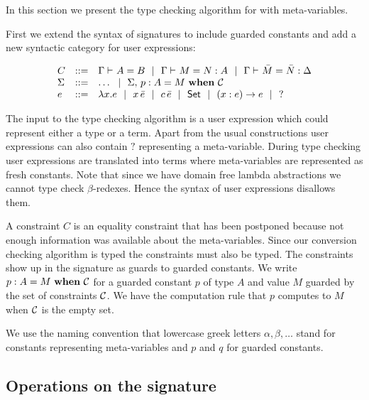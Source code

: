 
In this section we present the type checking algorithm for {\Core} with meta-variables.

First we extend
the syntax of signatures to include guarded constants and add a new syntactic
category for user expressions:

{\small
\[\begin{array}{lcll}
    C & ::= & {\Gamma} \vdash_{}A=B ~~|~~ {\Gamma} \vdash_{}M=N:A ~~|~~
	      {\Gamma} \vdash_{}\bar M=\bar N:\Delta \\
    \Sigma & ::= & \ldots ~~|~~
		{\Sigma},\,{} {p} : {A} = {M} ~\mathbf{when}~ {\mathcal{C}} \\
    e & ::= & \lambda x.{}e ~~|~~ x\,\bar e ~~|~~ c\,\bar e ~~|~~ \mathsf{Set} ~~|~~ (x:e)\to{}e ~~|~~ ? \\
\end{array}\]
}

The input to the type checking algorithm is a user expression which could
represent either a type or a term. Apart from the usual constructions user
expressions can also contain $?$ representing a meta-variable. During type
checking user expressions are translated into {\Core} terms where
meta-variables are represented as fresh constants. Note that since we have
domain free lambda abstractions we cannot type check $\beta$-redexes. Hence the
syntax of user expressions disallows them.

A constraint $C$ is an equality constraint that has been postponed
because not enough information was available about the meta-variables. Since
our conversion checking algorithm is typed the constraints must also be typed. The
constraints show up in the signature as guards to guarded constants. We write
${p} : {A} = {M} ~\mathbf{when}~ {\mathcal{C}}$ for a guarded constant $p$ of type $A$ and value $M$
guarded by the set of constraints $\mathcal{C}$. We have the computation rule that $p$
computes to $M$ when $\mathcal{C}$ is the empty set.

We use the naming convention that lowercase greek letters $\alpha, \beta,
\ldots$ stand for constants representing meta-variables and $p$ and $q$ for
guarded constants.

\subsection{Operations on the signature}

